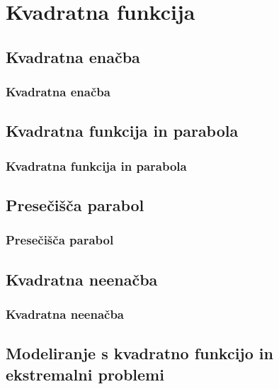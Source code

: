 \section{Kvadratna funkcija}

\begin{frame}
    \sectionpage
\end{frame}

\begin{frame}
\end{frame}

    \subsection{Kvadratna enačba}

        \begin{frame}
            \frametitle{Kvadratna enačba}
        \end{frame}

    \subsection{Kvadratna funkcija in parabola}

        \begin{frame}
            \frametitle{Kvadratna funkcija in parabola}
        \end{frame}

    \subsection{Presečišča parabol}

        \begin{frame}
            \frametitle{Presečišča parabol}
        \end{frame}

    \subsection{Kvadratna neenačba}

        \begin{frame}
            \frametitle{Kvadratna neenačba}
        \end{frame}

    \subsection{Modeliranje s kvadratno funkcijo in ekstremalni problemi}

